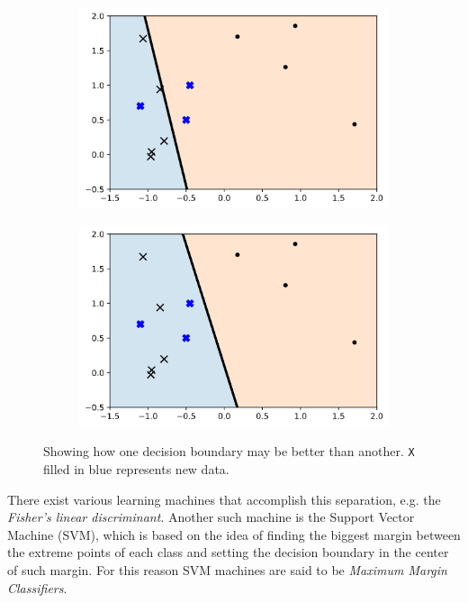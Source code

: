 \begin{figure}[H]
    \centering
    \begin{subfigure}[b]{0.4\linewidth}
        \includegraphics[width=\linewidth]{img/ch4/boundrybad.png}
    \end{subfigure}
    \begin{subfigure}[b]{0.4\linewidth}
        \includegraphics[width=\linewidth]{img/ch4/boundrygood.png}
    \end{subfigure}
    \caption{Showing how one decision boundary may be better than another. \texttt{X} filled in blue represents new data.}
    \label{fig:ch4.sep}
\end{figure}

There exist various learning machines that accomplish this separation, e.g. the \emph{Fisher’s linear discriminant}. Another such machine is the Support Vector Machine (SVM), which is based on the idea of finding the biggest margin between the extreme points of each class and setting the decision boundary in the center of such margin. For this reason SVM machines are said to be \emph{Maximum Margin Classifiers}.

